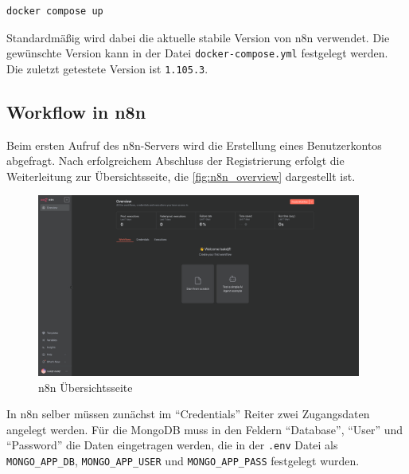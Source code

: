 \begin{verbatim}
docker compose up
\end{verbatim}

Standardmäßig wird dabei die aktuelle stabile Version von n8n verwendet. Die gewünschte Version kann
in der Datei \verb|docker-compose.yml| festgelegt werden. Die zuletzt getestete Version ist
\verb|1.105.3|.

\subsection{Workflow in n8n}\label{sub:workflow_in_n_n} %
Beim ersten Aufruf des n8n-Servers wird die Erstellung eines Benutzerkontos abgefragt. Nach
erfolgreichem Abschluss der Registrierung erfolgt die Weiterleitung zur Übersichtsseite, die
\autoref{fig:n8n_overview} dargestellt ist.

\begin{figure}
    \begin{center}
        \includegraphics[width=0.95\textwidth]{images/n8n_overview.png}
    \end{center}
    \caption{n8n Übersichtsseite}\label{fig:n8n_overview}
\end{figure}

In n8n selber müssen zunächst im \enquote{Credentials} Reiter zwei Zugangsdaten angelegt werden. Für
die MongoDB muss in den Feldern \enquote{Database}, \enquote{User} und \enquote{Password} die Daten
eingetragen werden, die in der \verb|.env| Datei als \verb|MONGO_APP_DB|, \verb|MONGO_APP_USER| und
\verb|MONGO_APP_PASS| festgelegt wurden.

